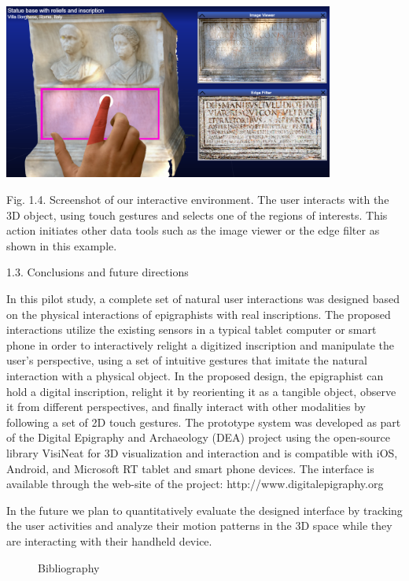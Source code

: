 \documentclass[amsthm,ebook]{saparticle}
\begin{document}
\bigskip

 \includegraphics[width=10.881cm,height=5.754cm]{EAGLE2016cameraready-img006.png} 

Fig. 1.4. Screenshot of our interactive environment. The user interacts with the 3D object, using touch gestures and
selects one of the regions of interests. This action initiates other data tools such as the image viewer or the edge
filter as shown in this example.

1.3. Conclusions and future directions

In this pilot study, a complete set of natural user interactions was designed based on the physical interactions of
epigraphists with real inscriptions. The proposed interactions utilize the existing sensors in a typical tablet
computer or smart phone in order to interactively relight a digitized inscription and manipulate the user's
perspective, using a set of intuitive gestures that imitate the natural interaction with a physical object. In the
proposed design, the epigraphist can {\textquotedbl}hold{\textquotedbl} a digital inscription, relight it by
reorienting it as a tangible object, observe it from different perspectives, and finally interact with other modalities
by following a set of 2D touch gestures. The prototype system was developed as part of the Digital Epigraphy and
Archaeology (DEA) project using the open-source library VisiNeat for 3D visualization and interaction and is compatible
with iOS, Android, and Microsoft RT tablet and smart phone devices. The interface is available through the web-site of
the project: http://www.digitalepigraphy.org

In the future we plan to quantitatively evaluate the designed interface by tracking the user activities and analyze
their motion patterns in the 3D space while they are interacting with their handheld device. 


\bigskip

 

\begin{figure}
\centering
\begin{minipage}{10.901cm}
Bibliography
\end{minipage}
\end{figure}
\end{document}
